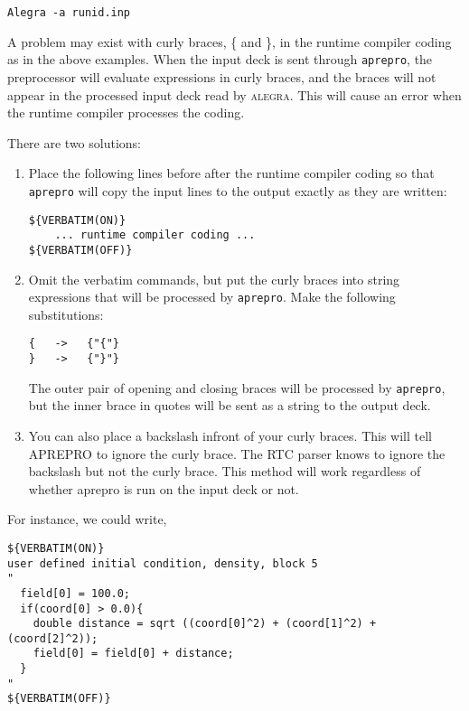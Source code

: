 \noindent
\texttt{Alegra -a runid.inp}

A problem may exist with curly braces, \{ and \}, in the runtime compiler coding
as in the above examples.  When the input deck is sent through \texttt{aprepro},
the preprocessor will evaluate expressions in curly braces, and the braces
will not appear in the processed input deck read by \textsc{alegra}.
This will cause an error when the runtime compiler processes the coding.

\noindent
There are two solutions:
\begin{enumerate}

\item Place the following lines before after the runtime compiler coding
      so that \texttt{aprepro} will copy the input lines to the output
      exactly as they are written:

{\ttfamily \begin{verbatim}
${VERBATIM(ON)}
    ... runtime compiler coding ...
${VERBATIM(OFF)}
\end{verbatim}
}

\item Omit the verbatim commands, but put the curly braces into string expressions
      that will be processed by \texttt{aprepro}.  Make the following substitutions:

{\ttfamily \begin{verbatim}
{   ->   {"{"}
}   ->   {"}"}
\end{verbatim}
}

The outer pair of opening and closing braces will be processed by \texttt{aprepro},
but the inner brace in quotes will be sent as a string to the output deck.

\item You can also place a backslash infront of your curly braces. This will
      tell APREPRO to ignore the curly brace. The RTC parser knows to ignore
      the backslash but not the curly brace. This method will work regardless
      of whether aprepro is run on the input deck or not.

\end{enumerate}

\noindent
For instance, we could write,
%
{\ttfamily \begin{verbatim}
${VERBATIM(ON)}
user defined initial condition, density, block 5
" 
  field[0] = 100.0;
  if(coord[0] > 0.0){
    double distance = sqrt ((coord[0]^2) + (coord[1]^2) + (coord[2]^2));
    field[0] = field[0] + distance;
  }
"
${VERBATIM(OFF)}
\end{verbatim}
}

